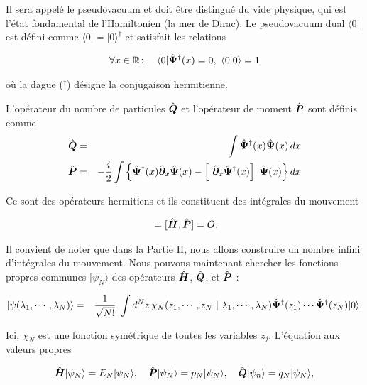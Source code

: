 Il sera appelé le pseudovacuum et doit être distingué du vide physique, qui est l'état fondamental de l'Hamiltonien (la mer de Dirac). Le pseudovacuum dual $\langle 0 \vert$ est défini comme $\langle 0 \vert = \vert 0 \rangle^\dag$ et satisfait les relations 

\begin{eqnarray}
	\forall x \in \mathbb{R} & \colon & \langle 0 \vert \hat{\bm{\Psi}}^\dag (x)  = 	0, ~\langle 0 \vert 0 \rangle = 1 
\end{eqnarray}

où la dague ($^\dag$) désigne la conjugaison hermitienne. 

L'opérateur du nombre de particules $\hat{\bm{Q}}$ et l'opérateur de moment $\hat{\bm{P}}$ sont définis comme 
\begin{eqnarray}
	\operator{Q} & = & \int \operator{\Psi}^\dag (x) \operator{\Psi} (x) \, d x \\
	\operator{P} & = & - \frac{i}2 \int \left \{  \operator{\Psi}^\dag(x) \operator{\partial}_x \operator{\Psi}(x) - \left [ \operator{\partial}_x \operator{\Psi}^\dag(x)\right ] \operator{\Psi}(x)\right \} dx \label{eq.1.7}
\end{eqnarray}

Ce sont des opérateurs hermitiens et ils constituent des intégrales du mouvement

\begin{eqnarray}
	[ \operator{H} , \operator{Q} ] = 	[ \operator{H} , \operator{P} ] = O. 
\end{eqnarray}

Il convient de noter que dans la Partie II, nous allons construire un nombre infini d'intégrales du mouvement. Nous pouvons maintenant chercher les fonctions propres communes $\vert \psi_N\rangle$ des opérateurs $\hat{\bm{H}}$, $\hat{\bm{Q}}$, et $\hat{\bm{P}}$ :

\begin{eqnarray}
	\vert \psi ( \lambda_1 , \cdots , \lambda_N ) \rangle & = & \frac{1}{\sqrt{N!}} \int d^N z \, \chi_N ( z_1 , \cdots , z_N  ~\vert ~ \lambda_1 , \cdots , \lambda _N ) \operator{\Psi}^\dag (z_1 ) \cdots \operator{\Psi}^\dag (z_N )	 \vert 0 \rangle. \label{eq.1.9}
\end{eqnarray}

Ici, $\chi_N$ est une fonction symétrique de toutes les variables $z_j$. L'équation aux valeurs propres 

\begin{eqnarray}
	\hat{\bm{H}} |\psi_N\rangle = E_N |\psi_N\rangle, \quad \hat{\bm{P}} |\psi_N\rangle = p_N |\psi_N\rangle, \quad \hat{\bm{Q}} |\psi_n\rangle = q_N |\psi_N\rangle,	
\end{eqnarray}

